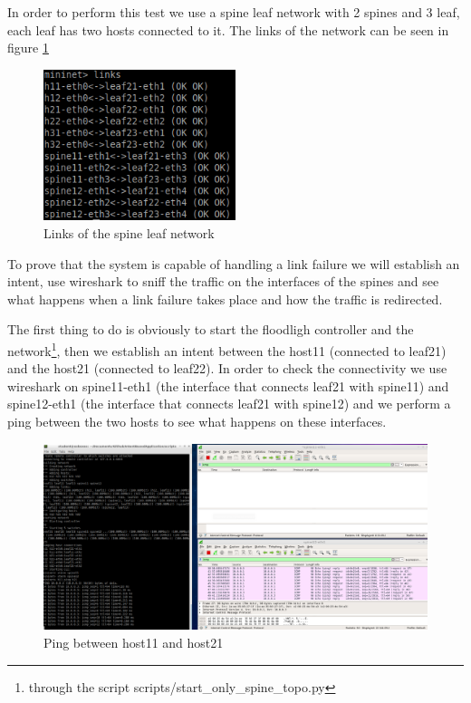 \noindent In order to perform this test we use a spine leaf network with 2 spines and 3 leaf, each leaf has two hosts connected to it. The links of the network can be seen in figure \ref{img:links}

\begin{figure}[h]
	\centering
	\includegraphics[width=0.50\textwidth]{img/links.png}
	\caption{Links of the spine leaf network}
	\label{img:links}
\end{figure}

\noindent To prove that the system is capable of handling a link failure we will establish an intent, use wireshark to sniff the traffic on the interfaces of the spines and see what happens when a link failure takes place and how the traffic is redirected.

\noindent The first thing to do is obviously to start the floodligh controller and the network\footnote{through the script scripts/start\_only\_spine\_topo.py}, then we establish an intent between the host11 (connected to leaf21) and the host21 (connected to leaf22). In order to check the connectivity we use wireshark on spine11-eth1 (the interface that connects leaf21 with spine11) and spine12-eth1 (the interface that connects leaf21 with spine12) and we perform a ping between the two hosts to see what happens on these interfaces.

\begin{figure}[h]
\centering
\includegraphics[width=1\textwidth]{img/ping1.png}
\caption{Ping between host11 and host21}
\label{img:ping1}
\end{figure}

